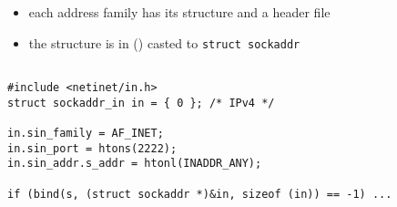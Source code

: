 

\begin{slide}

\begin{itemize}
\item each address family has its structure and a header file
\item the structure is in () casted to \texttt{struct sockaddr}
\end{itemize}

\begin{verbatim}

#include <netinet/in.h>
struct sockaddr_in in = { 0 }; /* IPv4 */

in.sin_family = AF_INET;
in.sin_port = htons(2222);
in.sin_addr.s_addr = htonl(INADDR_ANY);

if (bind(s, (struct sockaddr *)&in, sizeof (in)) == -1) ...
\end{verbatim}
\end{slide}

\label{BIND_EXAMPLE}

